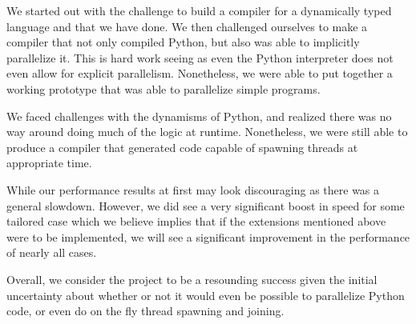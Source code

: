 \documentclass{acm_proc_article-sp}
\begin{document}
We started out with the challenge to build a compiler for a dynamically typed
language and that we have done. We then challenged ourselves to make a compiler
that not only compiled Python, but also was able to implicitly parallelize it.
This is hard work seeing as even the Python interpreter does not even allow for
explicit parallelism. Nonetheless, we were able to put together a working prototype
that was able to parallelize simple programs.

We faced challenges with the dynamisms of Python, and realized there was no way
around doing much of the logic at runtime. Nonetheless, we were still able to
produce a compiler that generated code capable of spawning threads at appropriate time.

While our performance results at first may look discouraging as there was a general
slowdown. However, we did see a very significant boost in speed for some tailored case
which we believe implies that if the extensions mentioned above were to be implemented,
we will see a significant improvement in the performance of nearly all cases.

Overall, we consider the project to be a resounding success given the initial uncertainty
about whether or not it would even be possible to parallelize Python code, or even do
on the fly thread spawning and joining.
\end{document}
